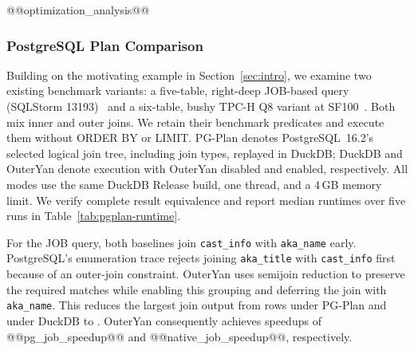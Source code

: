 @@optimization_analysis@@

\begin{table}[t]
\centering\scriptsize\setlength{\tabcolsep}{3.2pt}
\caption{Running time, query statistics, and optimization overhead for representative queries. Optimization ratio is $100\,T_{\rm opt}/T_{\rm runtime}$ for each configuration, using total optimizer time from a separate profile and the @@runtime_time@@. Attributes count distinct referenced columns per relation alias, including expanded SELECT stars, join predicates and filters. Queries are selected by family, shape and DuckDB runtime ranks, without ranking speed-up.}
\label{tab:optimization-time}
\end{table}

\subsubsection{PostgreSQL Plan Comparison}
\label{sec:pgplan-comparison}

Building on the motivating example in Section~\ref{sec:intro}, we examine two existing benchmark variants: a five-table, right-deep JOB-based query (SQLStorm 13193)~\cite{job} and a six-table, bushy TPC-H Q8 variant at SF100~\cite{tpch}. Both mix inner and outer joins. We retain their benchmark predicates and execute them without ORDER BY or LIMIT. PG-Plan denotes PostgreSQL~16.2's selected logical join tree, including join types, replayed in DuckDB; DuckDB and OuterYan denote execution with OuterYan disabled and enabled, respectively. All modes use the same DuckDB Release build, one thread, and a 4\,GB memory limit. We verify complete result equivalence and report median runtimes over five runs in Table~\ref{tab:pgplan-runtime}.

For the JOB query, both baselines join \texttt{cast\_info} with \texttt{aka\_name} early. PostgreSQL's enumeration trace rejects joining \texttt{aka\_title} with \texttt{cast\_info} first because of an outer-join constraint. OuterYan uses semijoin reduction to preserve the required matches while enabling this grouping and deferring the join with \texttt{aka\_name}. This reduces the largest join output from  rows under PG-Plan and  under DuckDB to . OuterYan consequently achieves speedups of @@pg_job_speedup@@ and @@native_job_speedup@@, respectively.

